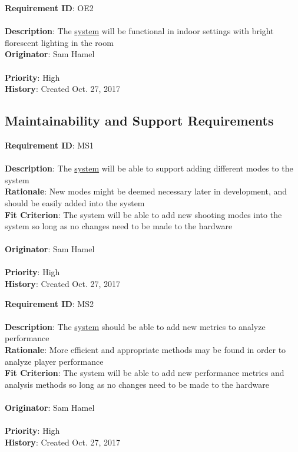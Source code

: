 \documentclass[11pt]{article}
\begin{document}
\begin{framed}
	\noindent\textbf{Requirement ID}: OE2 \\\\
	\noindent\textbf{Description}: The \hyperref[sec:definitions]{system} will be functional in indoor settings with bright florescent lighting in the room \\
	\textbf{Originator}: Sam Hamel \\\\
	\textbf{Priority}: High \hfill \\
	\noindent\textbf{History}: Created Oct. 27, 2017
\end{framed}

\subsection{Maintainability and Support Requirements}
\begin{framed}
	\noindent\textbf{Requirement ID}: MS1 \\\\
	\noindent\textbf{Description}: The \hyperref[sec:definitions]{system} will be able to support adding different modes to the system\\
	\textbf{Rationale}: New modes might be deemed necessary later in development, and should be easily added into the system \\
	\textbf{Fit Criterion}: The system will be able to add new shooting modes into the system so long as no changes need to be made to the hardware \\\\
	\textbf{Originator}: Sam Hamel \\\\
	\textbf{Priority}: High \hfill \\
	\noindent\textbf{History}: Created Oct. 27, 2017
\end{framed}

\begin{framed}
	\noindent\textbf{Requirement ID}: MS2 \\\\
	\noindent\textbf{Description}: The \hyperref[sec:definitions]{system} should be able to add new metrics to analyze performance\\
	\textbf{Rationale}: More efficient and appropriate methods may be found in order to analyze player performance\\
	\textbf{Fit Criterion}: The system will be able to add new performance metrics and analysis methods so long as no changes need to be made to the hardware\\\\
	\textbf{Originator}: Sam Hamel \\\\
	\textbf{Priority}: High \hfill \\
	\noindent\textbf{History}: Created Oct. 27, 2017
\end{framed}
\end{document}
